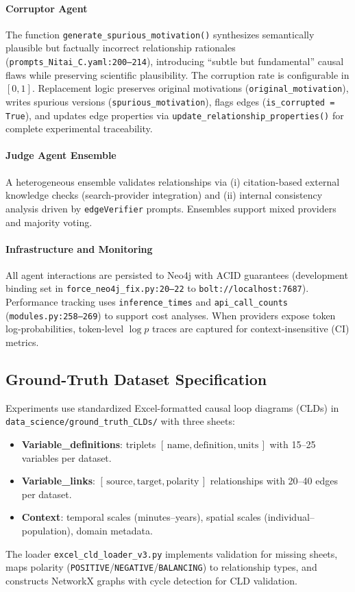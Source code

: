 \paragraph{Corruptor Agent}
The function \texttt{generate\_spurious\_motivation()} synthesizes semantically plausible but factually incorrect relationship rationales (\texttt{prompts\_Nitai\_C.yaml:200--214}), introducing ``subtle but fundamental'' causal flaws while preserving scientific plausibility. The corruption rate is configurable in \([0,1]\). Replacement logic preserves original motivations (\texttt{original\_motivation}), writes spurious versions (\texttt{spurious\_motivation}), flags edges (\texttt{is\_corrupted = True}), and updates edge properties via \texttt{update\_relationship\_properties()} for complete experimental traceability.

\paragraph{Judge Agent Ensemble}
A heterogeneous ensemble validates relationships via (i) citation-based external knowledge checks (search-provider integration) and (ii) internal consistency analysis driven by \texttt{edgeVerifier} prompts. Ensembles support mixed providers and majority voting.

\paragraph{Infrastructure and Monitoring}
All agent interactions are persisted to Neo4j with ACID guarantees (development binding set in \texttt{force\_neo4j\_fix.py:20--22} to \texttt{bolt://localhost:7687}). Performance tracking uses \texttt{inference\_times} and \texttt{api\_call\_counts} (\texttt{modules.py:258--269}) to support cost analyses. When providers expose token log-probabilities, token-level \(\log p\) traces are captured for context-insensitive (CI) metrics.

\subsection{Ground-Truth Dataset Specification}

Experiments use standardized Excel-formatted causal loop diagrams (CLDs) in \texttt{data\_science/ground\_truth\_CLDs/} with three sheets:
\begin{itemize}
  \item \textbf{Variable\_definitions}: triplets \([\,\text{name}, \text{definition}, \text{units}\,]\) with 15--25 variables per dataset.
  \item \textbf{Variable\_links}: \([\,\text{source}, \text{target}, \text{polarity}\,]\) relationships with 20--40 edges per dataset.
  \item \textbf{Context}: temporal scales (minutes--years), spatial scales (individual--population), domain metadata.
\end{itemize}
The loader \texttt{excel\_cld\_loader\_v3.py} implements validation for missing sheets, maps polarity (\texttt{POSITIVE}/\texttt{NEGATIVE}/\texttt{BALANCING}) to relationship types, and constructs NetworkX graphs with cycle detection for CLD validation.

